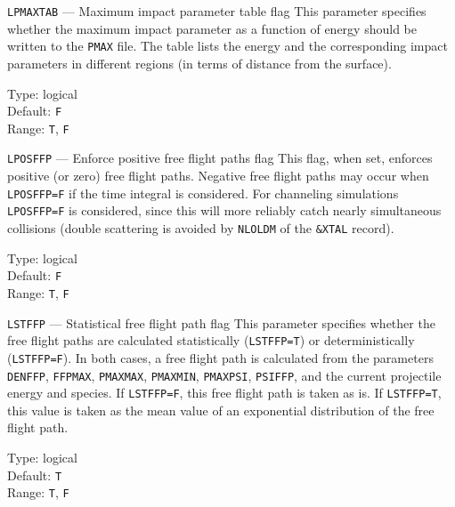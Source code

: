 \begin{keydescription}{\texttt{LPMAXTAB} --- Maximum impact parameter table flag}
%
  This parameter specifies whether the maximum impact parameter as a function 
  of energy should be written to the \texttt{PMAX} file. The table lists the
  energy and the corresponding impact parameters in different regions (in terms
  of distance from the surface).
  \begin{keytab}
    Type:    \> logical \\
    Default: \> \texttt{F} \\
    Range:   \> \texttt{T}, \texttt{F}
  \end{keytab}
\end{keydescription}

\begin{keydescription}{\texttt{LPOSFFP} --- Enforce positive free flight paths flag}
%
  This flag, when set, enforces positive (or zero) free flight paths. Negative 
  free flight paths may occur when \texttt{LPOSFFP=F} if the time integral is 
  considered. For channeling simulations \texttt{LPOSFFP=F} is considered, 
  since this will more reliably catch nearly simultaneous collisions (double 
  scattering is avoided by \texttt{NLOLDM} of the \texttt{\&XTAL} record).
  \begin{keytab}
    Type:    \> logical \\
    Default: \> \texttt{F} \\
    Range:   \> \texttt{T}, \texttt{F}
  \end{keytab}
\end{keydescription}

\begin{keydescription}{\texttt{LSTFFP} --- Statistical free flight path flag}
%
  This parameter specifies whether the free flight paths are calculated 
  statistically (\texttt{LSTFFP=T}) or deterministically (\texttt{LSTFFP=F}). 
  In both cases, a free flight path is calculated from the parameters 
  \texttt{DENFFP}, \texttt{FFPMAX}, \texttt{PMAXMAX}, \texttt{PMAXMIN}, 
  \texttt{PMAXPSI}, \texttt{PSIFFP}, and the current projectile energy and 
  species. If \texttt{LSTFFP=F}, this free flight path is taken as is. If 
  \texttt{LSTFFP=T}, this value is taken as the mean value of an exponential
  distribution of the free flight path.
  \begin{keytab}
    Type:    \> logical \\
    Default: \> \texttt{T} \\
    Range:   \> \texttt{T}, \texttt{F}
  \end{keytab}
\end{keydescription}

